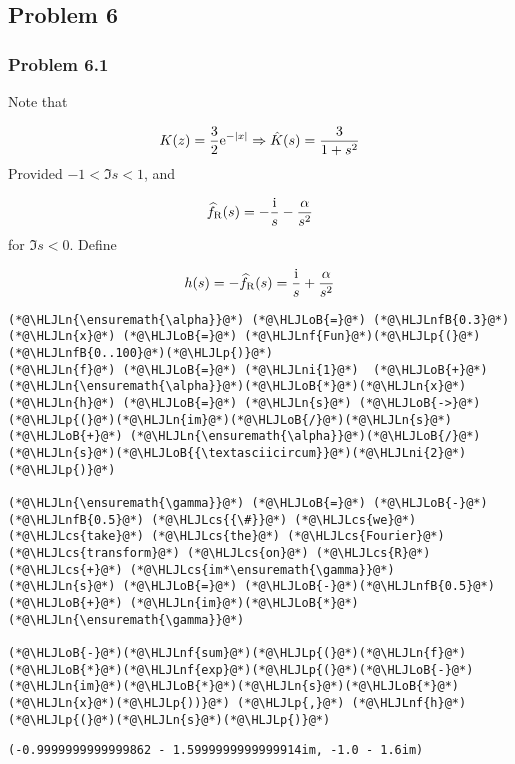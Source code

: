 \documentclass[12pt,a4paper]{article}
\newcommand{\HLJLn}[1]{#1}
\newcommand{\HLJLnf}[1]{\textcolor[RGB]{66,102,213}{#1}}
\newcommand{\HLJLnfB}[1]{\textcolor[RGB]{59,151,46}{#1}}
\newcommand{\HLJLni}[1]{\textcolor[RGB]{59,151,46}{#1}}
\newcommand{\HLJLoB}[1]{\textcolor[RGB]{102,102,102}{\textbf{#1}}}
\newcommand{\HLJLp}[1]{#1}
\newcommand{\HLJLcs}[1]{\textcolor[RGB]{153,153,119}{\textit{#1}}}
\def\I{ {\rm i} }
\def\E{ {\rm e} }
\begin{document}
\subsection{Problem 6}
\subsubsection{Problem 6.1}
Note that

\[
K(z) =  {3\over 2} \E^{-|x|} \Rightarrow \hat K(s) = {3 \over 1+s^2}
\]
Provided $-1 < \Im s < 1$, and

\[
\widehat f_{\rm R}(s) = -{\I \over s} - {\alpha \over s^2}
\]
for $\Im s < 0$.  Define

\[
h(s) = - \widehat f_{\rm R}(s) = {\I \over s} + {\alpha \over s^2}
\]

\begin{lstlisting}
(*@\HLJLn{\ensuremath{\alpha}}@*) (*@\HLJLoB{=}@*) (*@\HLJLnfB{0.3}@*)
(*@\HLJLn{x}@*) (*@\HLJLoB{=}@*) (*@\HLJLnf{Fun}@*)(*@\HLJLp{(}@*)(*@\HLJLnfB{0..100}@*)(*@\HLJLp{)}@*)
(*@\HLJLn{f}@*) (*@\HLJLoB{=}@*) (*@\HLJLni{1}@*)  (*@\HLJLoB{+}@*) (*@\HLJLn{\ensuremath{\alpha}}@*)(*@\HLJLoB{*}@*)(*@\HLJLn{x}@*)
(*@\HLJLn{h}@*) (*@\HLJLoB{=}@*) (*@\HLJLn{s}@*) (*@\HLJLoB{->}@*) (*@\HLJLp{(}@*)(*@\HLJLn{im}@*)(*@\HLJLoB{/}@*)(*@\HLJLn{s}@*) (*@\HLJLoB{+}@*) (*@\HLJLn{\ensuremath{\alpha}}@*)(*@\HLJLoB{/}@*)(*@\HLJLn{s}@*)(*@\HLJLoB{{\textasciicircum}}@*)(*@\HLJLni{2}@*)(*@\HLJLp{)}@*)

(*@\HLJLn{\ensuremath{\gamma}}@*) (*@\HLJLoB{=}@*) (*@\HLJLoB{-}@*)(*@\HLJLnfB{0.5}@*) (*@\HLJLcs{{\#}}@*) (*@\HLJLcs{we}@*) (*@\HLJLcs{take}@*) (*@\HLJLcs{the}@*) (*@\HLJLcs{Fourier}@*) (*@\HLJLcs{transform}@*) (*@\HLJLcs{on}@*) (*@\HLJLcs{R}@*) (*@\HLJLcs{+}@*) (*@\HLJLcs{im*\ensuremath{\gamma}}@*)
(*@\HLJLn{s}@*) (*@\HLJLoB{=}@*) (*@\HLJLoB{-}@*)(*@\HLJLnfB{0.5}@*) (*@\HLJLoB{+}@*) (*@\HLJLn{im}@*)(*@\HLJLoB{*}@*)(*@\HLJLn{\ensuremath{\gamma}}@*)

(*@\HLJLoB{-}@*)(*@\HLJLnf{sum}@*)(*@\HLJLp{(}@*)(*@\HLJLn{f}@*)(*@\HLJLoB{*}@*)(*@\HLJLnf{exp}@*)(*@\HLJLp{(}@*)(*@\HLJLoB{-}@*)(*@\HLJLn{im}@*)(*@\HLJLoB{*}@*)(*@\HLJLn{s}@*)(*@\HLJLoB{*}@*)(*@\HLJLn{x}@*)(*@\HLJLp{))}@*) (*@\HLJLp{,}@*) (*@\HLJLnf{h}@*)(*@\HLJLp{(}@*)(*@\HLJLn{s}@*)(*@\HLJLp{)}@*)
\end{lstlisting}

\begin{lstlisting}
(-0.9999999999999862 - 1.5999999999999914im, -1.0 - 1.6im)
\end{lstlisting}
\end{document}
